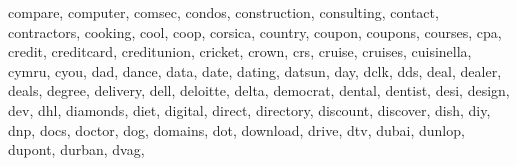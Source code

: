 \documentclass[letterpaper,10pt,english]{sphinxmanual}
\begin{document}
\begin{fulllineitems}
\begin{fulllineitems}
\textquotesingle{}compare\textquotesingle{}, \textquotesingle{}computer\textquotesingle{}, \textquotesingle{}comsec\textquotesingle{}, \textquotesingle{}condos\textquotesingle{}, \textquotesingle{}construction\textquotesingle{}, \textquotesingle{}consulting\textquotesingle{}, \textquotesingle{}contact\textquotesingle{}, \textquotesingle{}contractors\textquotesingle{}, \textquotesingle{}cooking\textquotesingle{}, \textquotesingle{}cool\textquotesingle{}, \textquotesingle{}coop\textquotesingle{}, \textquotesingle{}corsica\textquotesingle{}, \textquotesingle{}country\textquotesingle{}, \textquotesingle{}coupon\textquotesingle{}, \textquotesingle{}coupons\textquotesingle{}, \textquotesingle{}courses\textquotesingle{}, \textquotesingle{}cpa\textquotesingle{}, \textquotesingle{}credit\textquotesingle{}, \textquotesingle{}creditcard\textquotesingle{}, \textquotesingle{}creditunion\textquotesingle{}, \textquotesingle{}cricket\textquotesingle{}, \textquotesingle{}crown\textquotesingle{}, \textquotesingle{}crs\textquotesingle{}, \textquotesingle{}cruise\textquotesingle{}, \textquotesingle{}cruises\textquotesingle{}, \textquotesingle{}cuisinella\textquotesingle{}, \textquotesingle{}cymru\textquotesingle{}, \textquotesingle{}cyou\textquotesingle{}, \textquotesingle{}dad\textquotesingle{}, \textquotesingle{}dance\textquotesingle{}, \textquotesingle{}data\textquotesingle{}, \textquotesingle{}date\textquotesingle{}, \textquotesingle{}dating\textquotesingle{}, \textquotesingle{}datsun\textquotesingle{}, \textquotesingle{}day\textquotesingle{}, \textquotesingle{}dclk\textquotesingle{}, \textquotesingle{}dds\textquotesingle{}, \textquotesingle{}deal\textquotesingle{}, \textquotesingle{}dealer\textquotesingle{}, \textquotesingle{}deals\textquotesingle{}, \textquotesingle{}degree\textquotesingle{}, \textquotesingle{}delivery\textquotesingle{}, \textquotesingle{}dell\textquotesingle{}, \textquotesingle{}deloitte\textquotesingle{}, \textquotesingle{}delta\textquotesingle{}, \textquotesingle{}democrat\textquotesingle{}, \textquotesingle{}dental\textquotesingle{}, \textquotesingle{}dentist\textquotesingle{}, \textquotesingle{}desi\textquotesingle{}, \textquotesingle{}design\textquotesingle{}, \textquotesingle{}dev\textquotesingle{}, \textquotesingle{}dhl\textquotesingle{}, \textquotesingle{}diamonds\textquotesingle{}, \textquotesingle{}diet\textquotesingle{}, \textquotesingle{}digital\textquotesingle{}, \textquotesingle{}direct\textquotesingle{}, \textquotesingle{}directory\textquotesingle{}, \textquotesingle{}discount\textquotesingle{}, \textquotesingle{}discover\textquotesingle{}, \textquotesingle{}dish\textquotesingle{}, \textquotesingle{}diy\textquotesingle{}, \textquotesingle{}dnp\textquotesingle{}, \textquotesingle{}docs\textquotesingle{}, \textquotesingle{}doctor\textquotesingle{}, \textquotesingle{}dog\textquotesingle{}, \textquotesingle{}domains\textquotesingle{}, \textquotesingle{}dot\textquotesingle{}, \textquotesingle{}download\textquotesingle{}, \textquotesingle{}drive\textquotesingle{}, \textquotesingle{}dtv\textquotesingle{}, \textquotesingle{}dubai\textquotesingle{}, \textquotesingle{}dunlop\textquotesingle{}, \textquotesingle{}dupont\textquotesingle{}, \textquotesingle{}durban\textquotesingle{}, \textquotesingle{}dvag\textquotesingle{}, 
\end{fulllineitems}
\end{fulllineitems}
\end{document}
